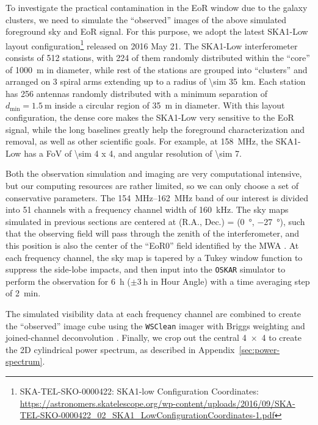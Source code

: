 \documentclass[modern]{aastex61}
\newcommand{\R}[1]{\mathrm{#1}}
\begin{document}
To investigate the practical contamination in the EoR window due to the
galaxy clusters, we need to simulate the \enquote{observed} images of
the above simulated foreground sky and EoR signal.
For this purpose,
we adopt the latest SKA1-Low layout configuration\footnote{%
  SKA-TEL-SKO-0000422: SKA1-low Configuration Coordinates: \url{https://astronomers.skatelescope.org/wp-content/uploads/2016/09/SKA-TEL-SKO-0000422_02_SKA1_LowConfigurationCoordinates-1.pdf}}
released on 2016 May 21.
The SKA1-Low interferometer consists of 512 stations, with 224 of them
randomly distributed within the \enquote{core} of \SI{1000}{\meter} in
diameter, while rest of the stations are grouped into \enquote{clusters}
and arranged on 3 spiral arms extending up to a radius of
\SI{\sim 35}{\kilo\meter}.
Each station has 256 antennas randomly distributed with a minimum separation
of $d_{\R{min}} = \SI{1.5}{\meter}$ inside a circular region of
\SI{35}{\meter} in diameter.
With this layout configuration, the dense core makes the SKA1-Low very
sensitive to the EoR signal, while the long baselines greatly help the
foreground characterization and removal, as well as other scientific goals.
For example, at \SI{158}{\MHz}, the SKA1-Low has a FoV of
\SI{\sim 4 x 4}{\deg}, and angular resolution of \SI{\sim 7}{\arcsec}.

Both the observation simulation and imaging are very computational
intensive, but our computing resources are rather limited, so we can
only choose a set of conservative parameters.
The \SIrange{154}{162}{\MHz} band of our interest is divided into 51
channels with a frequency channel width of \SI{160}{\kilo\hertz}.
The sky maps simulated in previous sections are centered at (R.A., Dec.)
= (\SI{0}{\degree}, \SI{-27}{\degree}), such that the observing field
will pass through the zenith of the interferometer, and this position
is also the center of the \enquote{EoR0} field identified by the MWA
\citep{beardsley2016}.
At each frequency channel, the sky map is tapered by a Tukey window
function to suppress the side-lobe impacts, and then input into the
\texttt{OSKAR} simulator \citep{mort2010} to perform the observation
for \SI{6}{\hour} ($\pm \SI{3}{\hour}$ in Hour Angle) with a time
averaging step of \SI{2}{\minute}.

The simulated visibility data at each frequency channel are combined
to create the \enquote{observed} image cube using the \texttt{WSClean}
imager \citep{offringa2014} with Briggs weighting and joined-channel
deconvolution \citep{offringa2017}.
Finally, we crop out the central \SI{4 x 4}{\deg} to create the 2D
cylindrical power spectrum, as described in Appendix~\ref{sec:power-spectrum}.
\end{document}
